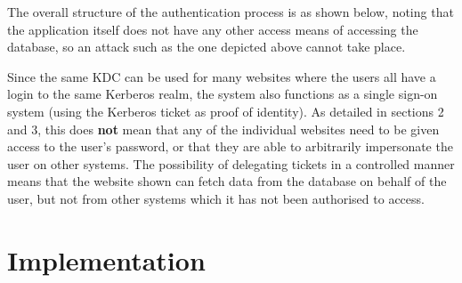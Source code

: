 \documentclass{article}
\begin{document}
The overall structure of the authentication process is as shown below, noting that the application itself does not have any other access means of accessing the database, so an attack such as the one depicted above cannot take place.

Since the same KDC can be used for many websites where the users all have a login to the same Kerberos realm, the system also functions as a single sign-on system (using the Kerberos ticket as proof of identity). As detailed in sections 2 and 3, this does \textbf{not} mean that any of the individual websites need to be given access to the user's password, or that they are able to arbitrarily impersonate the user on other systems. The possibility of delegating tickets in a controlled manner means that the website shown can fetch data from the database on behalf of the user, but not from other systems which it has not been authorised to access.



\section{Implementation}
\end{document}
